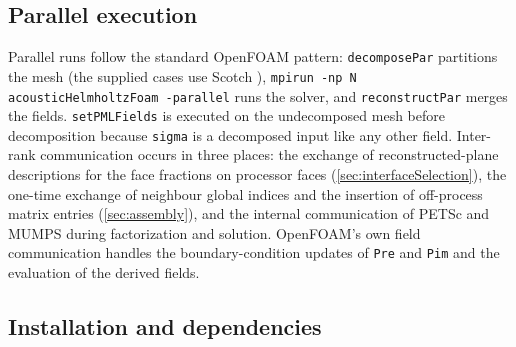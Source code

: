 \documentclass[final,12pt,nopreprintline]{elsarticle}
\newcommand{\code}[1]{\texttt{#1}}
\begin{document}
\subsection{Parallel execution}
\label{sec:parallel}

Parallel runs follow the standard OpenFOAM pattern: \code{decomposePar}
partitions the mesh (the supplied cases use Scotch \cite{Chevalier2008}),
\code{mpirun -np N acousticHelmholtzFoam -parallel} runs the solver, and
\code{reconstructPar} merges the fields.  \code{setPMLFields} is executed on
the undecomposed mesh before decomposition because \code{sigma} is a
decomposed input like any other field.  Inter-rank communication occurs in
three places: the exchange of reconstructed-plane descriptions for the face
fractions on processor faces (\cref{sec:interfaceSelection}), the one-time
exchange of neighbour global indices and the insertion of off-process matrix
entries (\cref{sec:assembly}), and the internal communication of PETSc and
MUMPS during factorization and solution.  OpenFOAM's own field communication
handles the boundary-condition updates of \code{Pre} and \code{Pim} and the
evaluation of the derived fields.

\subsection{Installation and dependencies}
\label{sec:installation}
\end{document}
